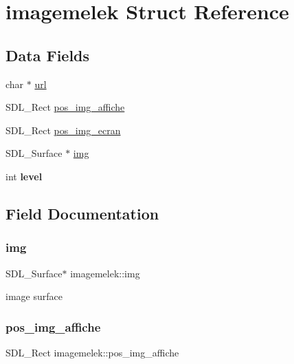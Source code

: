 \hypertarget{structimagemelek}{}\section{imagemelek Struct Reference}
\label{structimagemelek}
\subsection*{Data Fields}
\begin{DoxyCompactItemize}
\item 
char $\ast$ \hyperlink{structimagemelek_a7185e3dc62b91db033944d7886294b23}{url}
\item 
S\+D\+L\+\_\+\+Rect \hyperlink{structimagemelek_af393344191a18d34e8dc8f38b07c2a87}{pos\+\_\+img\+\_\+affiche}
\item 
S\+D\+L\+\_\+\+Rect \hyperlink{structimagemelek_a331ba4a6496257d6cb505b9149a94d11}{pos\+\_\+img\+\_\+ecran}
\item 
S\+D\+L\+\_\+\+Surface $\ast$ \hyperlink{structimagemelek_a63da49f3e5451fb795fc255921e7d307}{img}
\item 
\mbox{\label{structimagemelek_ae93a3cd30c0d4da0c94502d089be1b1d}} 
int {\bfseries level}
\end{DoxyCompactItemize}


\subsection{Field Documentation}
\mbox{\label{structimagemelek_a63da49f3e5451fb795fc255921e7d307}} 
\subsubsection{\texorpdfstring{img}{img}}
{\footnotesize\ttfamily S\+D\+L\+\_\+\+Surface$\ast$ imagemelek\+::img}

image surface \mbox{\label{structimagemelek_af393344191a18d34e8dc8f38b07c2a87}} 
\subsubsection{\texorpdfstring{pos\+\_\+img\+\_\+affiche}{pos\_img\_affiche}}
{\footnotesize\ttfamily S\+D\+L\+\_\+\+Rect imagemelek\+::pos\+\_\+img\+\_\+affiche}

